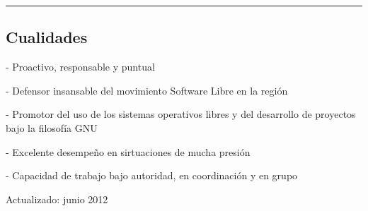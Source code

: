 \documentclass[10pt,letterpaper]{article}
\newenvironment{indentsection}[1]%
{\begin{list}{}%
	{\setlength{\leftmargin}{#1}}%
	\item[]%
}
{\end{list}}
\begin{document}
\hrule
\vspace{-0.4em}
\subsection*{Cualidades}

\begin{indentsection}{\parindent}
\begin{description*}
	\item - Proactivo, responsable y puntual
	\item - Defensor insansable del movimiento Software Libre en la región
  \item - Promotor del uso de los sistemas operativos libres y del desarrollo de proyectos bajo la
  filosofía GNU
  \item - Excelente desempeño en sirtuaciones de mucha presión
  \item - Capacidad de trabajo bajo autoridad, en coordinación y en grupo	
\end{description*}
\end{indentsection}

\begin{center}
  {\small {\footnotesize Actualizado: junio 2012}}
\end{center}
\end{document}
